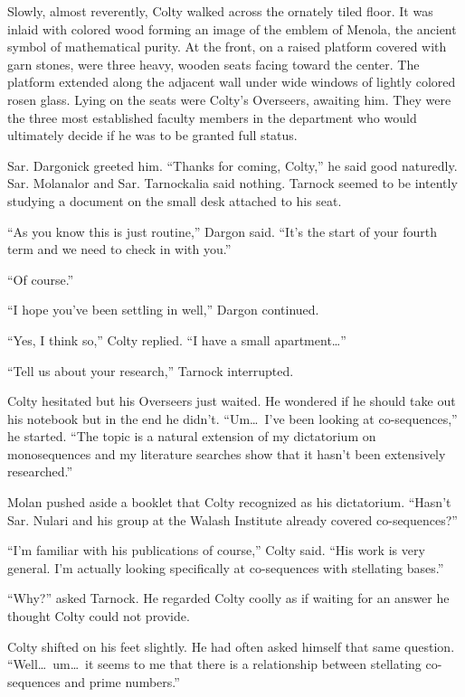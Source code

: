 Slowly, almost reverently, Colty walked across the ornately tiled floor. It was inlaid with
colored wood forming an image of the emblem of Menola, the ancient symbol of mathematical
purity. At the front, on a raised platform covered with garn stones, were three heavy, wooden
seats facing toward the center. The platform extended along the adjacent wall under wide windows
of lightly colored rosen glass. Lying on the seats were Colty's Overseers, awaiting him. They
were the three most established faculty members in the department who would ultimately decide if
he was to be granted full status.

Sar. Dargonick greeted him. ``Thanks for coming, Colty,'' he said good naturedly. Sar. Molanalor
and Sar. Tarnockalia said nothing. Tarnock seemed to be intently studying a document on the
small desk attached to his seat.

``As you know this is just routine,'' Dargon said. ``It's the start of your fourth term and we
need to check in with you.''

``Of course.''

``I hope you've been settling in well,'' Dargon continued.

``Yes, I think so,'' Colty replied. ``I have a small apartment\ldots''

``Tell us about your research,'' Tarnock interrupted.

Colty hesitated but his Overseers just waited. He wondered if he should take out his notebook
but in the end he didn't. ``Um\ldots\ I've been looking at co-sequences,'' he started. ``The
topic is a natural extension of my dictatorium on monosequences and my literature searches show
that it hasn't been extensively researched.''

Molan pushed aside a booklet that Colty recognized as his dictatorium. ``Hasn't Sar. Nulari and
his group at the Walash Institute already covered co-sequences?''

``I'm familiar with his publications of course,'' Colty said. ``His work is very general. I'm
actually looking specifically at co-sequences with stellating bases.''

``Why?'' asked Tarnock. He regarded Colty coolly as if waiting for an answer he thought Colty
could not provide.

Colty shifted on his feet slightly. He had often asked himself that same question. ``Well\ldots\
um\ldots\ it seems to me that there is a relationship between stellating co-sequences and prime
numbers.''

